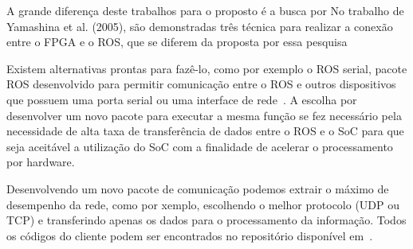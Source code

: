 A grande diferença deste trabalhos para o proposto é a busca por No trabalho de Yamashina et al. (2005), são demonstradas três técnica para realizar a conexão entre o FPGA e o ROS, que se diferem da proposta por essa pesquisa




Existem alternativas prontas para fazê-lo, como por exemplo o ROS serial, pacote ROS desenvolvido para permitir comunicação entre o ROS e outros dispositivos que possuem uma porta serial ou uma interface de rede~\cite{RosSeria}. A escolha por desenvolver um novo pacote para executar a mesma função se fez necessário pela necessidade de alta taxa de transferência de dados entre o ROS e o SoC para que seja aceitável a utilização do SoC com a finalidade de acelerar o processamento por hardware. 

Desenvolvendo um novo pacote de comunicação podemos extrair o máximo de desempenho da rede, como por  xemplo, escolhendo o melhor protocolo (UDP ou TCP) e transferindo apenas os dados para o processamento da informação. Todos os códigos do cliente podem ser encontrados no repositório disponível em~\cite{interface-socket}.
